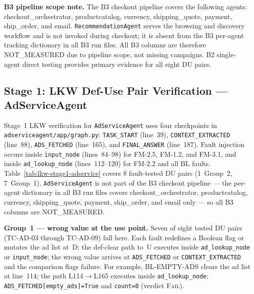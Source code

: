\documentclass[sigconf,review,anonymous,balance=false]{acmart}
\begin{document}
\begin{table}[t]
\smallskip\par\noindent
\textbf{B3 pipeline scope note.}
The B3 checkout pipeline covers the following agents:
checkout\_orchestrator, productcatalog, currency, shipping\_quote, payment,
ship\_order, and email.
\texttt{RecommendationAgent} serves the browsing and discovery workflow and
is not invoked during checkout; it is absent from the B3 per-agent tracking
dictionary in all B3 run files.
All B3 columns are therefore NOT\_MEASURED due to pipeline scope, not missing
campaigns.
B2 single-agent direct testing provides primary evidence for all eight DU
pairs.
\end{table}

\subsection{Stage 1: LKW Def-Use Pair Verification --- AdServiceAgent}
\label{sec:lkw-stage1-adservice}

Stage~1 LKW verification for \texttt{AdServiceAgent} uses four checkpoints
in \texttt{adserviceagent/app/graph.py}: \texttt{TASK\_START} (line~39),
\texttt{CONTEXT\_EXTRACTED} (line~88), \texttt{ADS\_FETCHED} (line~165), and
\texttt{FINAL\_ANSWER} (line~187).
Fault injection occurs inside \texttt{input\_node} (lines~84--98) for
FM-2.5, FM-1.2, and FM-3.1, and inside \texttt{ad\_lookup\_node}
(lines~112--120) for FM-2.2 and all BL faults.
Table~\ref{tab:lkw-stage1-adservice} covers 8 fault-tested DU pairs
(1~Group~2, 7~Group~1).
\texttt{AdServiceAgent} is not part of the B3 checkout pipeline --- the
per-agent dictionary in all B3 run files covers
checkout\_orchestrator, productcatalog, currency, shipping\_quote, payment,
ship\_order, and email only --- so all B3 columns are NOT\_MEASURED.

\textbf{Group~1 --- wrong value at the use point.}
Seven of eight tested DU pairs (TC-AD-03 through TC-AD-09) fall here.
Each fault redefines a Boolean flag or mutates the ad list at~D;
the def-clear path to~U executes inside \texttt{ad\_lookup\_node} or
\texttt{input\_node}; the wrong value arrives at \texttt{ADS\_FETCHED} or
\texttt{CONTEXT\_EXTRACTED} and the comparison flags failure.
For example, BL-EMPTY-ADS clears the ad list at line~114;
the path L114$\to$L165 executes inside \texttt{ad\_lookup\_node};
\texttt{ADS\_FETCHED[empty\_ads]=True} and \texttt{count=0}
(verdict \textsc{Fail}).
\end{document}
